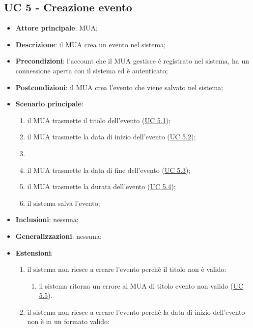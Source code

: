\subsection{UC 5 - Creazione evento} \label{sec:UC5}
    \begin{itemize}
        \item \textbf{Attore principale}: MUA;
        \item \textbf{Descrizione}: il MUA crea un evento nel sistema;
        \item \textbf{Precondizioni}: l’account che il MUA gestisce è registrato nel sistema, ha un connessione aperta con il sistema ed è autenticato;
        \item \textbf{Postcondizioni}: il MUA crea l'evento che viene salvato nel sistema;
        \item \textbf{Scenario principale}:
            \begin{enumerate}
                \item il MUA trasmette il titolo dell'evento (\hyperref[sec:UC5.1]{UC 5.1});
                \item il MUA trasmette la data di inizio dell'evento (\hyperref[sec:UC5.2]{UC 5.2});
                \item \item il MUA trasmette la data di fine dell'evento (\hyperref[sec:UC5.3]{UC 5.3});
                \item il MUA trasmette la durata dell'evento (\hyperref[sec:UC5.4]{UC 5.4});
                \item il sistema salva l'evento;
            \end{enumerate}
        \item \textbf{Inclusioni}: nessuna;
        \item \textbf{Generalizzazioni}: nessuna;
        \item \textbf{Estensioni}: 
        \begin{enumerate}[label=\alph*.]
            \item il sistema non riesce a creare l'evento perchè il titolo non è valido:
            \begin{enumerate}[label=\arabic*.]
                \item il sistema ritorna un errore al MUA di titolo evento non valido (\hyperref[sec:UC5.5]{UC 5.5}).
            \end{enumerate}
            \item il sistema non riesce a creare l'evento perchè la data di inizio dell'evento non è in un formato valido:

\end{enumerate}
\end{itemize}
